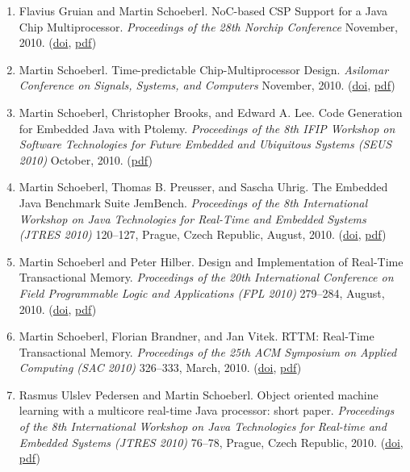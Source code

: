 \begin{enumerate}
\item Flavius Gruian and Martin Schoeberl.
 NoC-based CSP Support for a Java Chip Multiprocessor.
 \emph{Proceedings of the 28th Norchip Conference} November, 2010.
(\href{http://dx.doi.org/10.1109/NORCHIP.2010.5669484}{doi}, \href{http://www.jopdesign.com/doc/csp_on_jop.pdf}{pdf})

\item Martin Schoeberl.
 Time-predictable Chip-Multiprocessor Design.
 \emph{Asilomar Conference on Signals, Systems, and Computers} November, 2010.
(\href{http://dx.doi.org/10.1109/ACSSC.2010.5757923}{doi}, \href{http://www.jopdesign.com/doc/tpcmp.pdf}{pdf})

\item Martin Schoeberl, Christopher Brooks, and Edward A. Lee.
 Code Generation for Embedded Java with Ptolemy.
 \emph{Proceedings of the 8th IFIP Workshop on Software Technologies for Future Embedded and Ubiquitous Systems (SEUS 2010)} October, 2010.
(\href{http://www.jopdesign.com/doc/codegen.pdf}{pdf})

\item Martin Schoeberl, Thomas B. Preusser, and Sascha Uhrig.
 The Embedded Java Benchmark Suite JemBench.
 \emph{Proceedings of the 8th International Workshop on Java Technologies for Real-Time and Embedded Systems (JTRES 2010)} 120--127, Prague, Czech Republic, August, 2010.
(\href{http://dx.doi.org/10.1145/1850771.1850789}{doi}, \href{http://www.jopdesign.com/doc/jembench.pdf}{pdf})

\item Martin Schoeberl and Peter Hilber.
 Design and Implementation of Real-Time Transactional Memory.
 \emph{Proceedings of the 20th International Conference on Field Programmable Logic and Applications (FPL 2010)} 279--284, August, 2010.
(\href{http://dx.doi.org/10.1109/FPL.2010.64}{doi}, \href{http://www.jopdesign.com/doc/rttmimpl.pdf}{pdf})

\item Martin Schoeberl, Florian Brandner, and Jan Vitek.
 RTTM: Real-Time Transactional Memory.
 \emph{Proceedings of the 25th ACM Symposium on Applied Computing (SAC 2010)} 326--333, March, 2010.
(\href{http://dx.doi.org/10.1145/1774088.1774158}{doi}, \href{http://www.jopdesign.com/doc/rttm.pdf}{pdf})

\item Rasmus Ulslev Pedersen and Martin Schoeberl.
 Object oriented machine learning with a multicore real-time Java processor: short paper.
 \emph{Proceedings of the 8th International Workshop on Java Technologies for Real-time and Embedded Systems (JTRES 2010)} 76--78, Prague, Czech Republic, 2010.
(\href{http://dx.doi.org/10.1145/1850771.1850782}{doi}, \href{http://www.jopdesign.com/doc/jopmulticoresvm_short.pdf}{pdf})


\end{enumerate}

